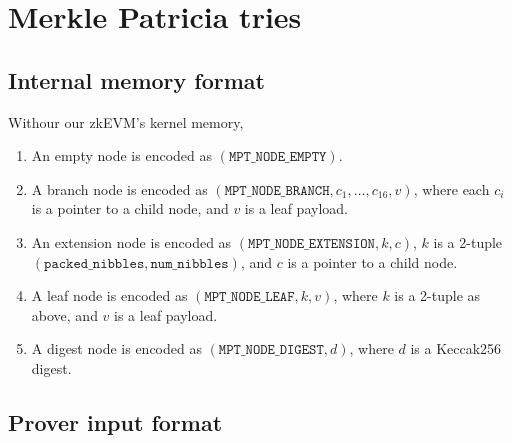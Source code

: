 \section{Merkle Patricia tries}
\label{tries}

\subsection{Internal memory format}

Withour our zkEVM's kernel memory,
\begin{enumerate}
  \item An empty node is encoded as $(\texttt{MPT\_NODE\_EMPTY})$.
  \item A branch node is encoded as $(\texttt{MPT\_NODE\_BRANCH}, c_1, \dots, c_{16}, v)$, where each $c_i$ is a pointer to a child node, and $v$ is a leaf payload.
  \item An extension node is encoded as $(\texttt{MPT\_NODE\_EXTENSION}, k, c)$, $k$ is a 2-tuple $(\texttt{packed\_nibbles}, \texttt{num\_nibbles})$, and $c$ is a pointer to a child node.
  \item A leaf node is encoded as $(\texttt{MPT\_NODE\_LEAF}, k, v)$, where $k$ is a 2-tuple as above, and $v$ is a leaf payload.
  \item A digest node is encoded as $(\texttt{MPT\_NODE\_DIGEST}, d)$, where $d$ is a Keccak256 digest.
\end{enumerate}


\subsection{Prover input format}
